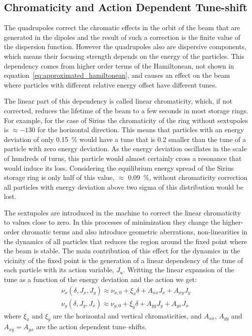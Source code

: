 \subsection{Chromaticity and Action Dependent Tune-shift}\label{sec:chromaticity}

	The quadrupoles correct the chromatic effects in the orbit of the beam that are generated in the dipoles and the result of such a correction is the finite value of the dispersion function. However the quadrupoles also are dispersive components, which means their focusing strength depends on the energy of the particles. This dependency comes from higher order terms of the Hamiltonean, not shown in equation~\eqref{eq:approximated_hamiltonean}, and causes an effect on the beam where particles with different relative energy offset have different tunes.

    The linear part of this dependency is called linear chromaticity, which, if not corrected, reduces the lifetime of the beam to a few seconds in most storage rings. For example, for the case of Sirius the chromaticity of the ring without sextupoles is $\approx -130$ for the horizontal direction. This means that particles with an energy deviation of only \SI{0.15}{\percent} would have a tune that is \SI{0.2}{} smaller than the tune of a particle with zero energy deviation. As the energy deviation oscillates in the scale of hundreds of turns, this particle would almost certainly cross a resonance that would induce its loss. Considering the equilibrium energy spread of the Sirius storage ring is only half of this value, $\approx$ \SI{0.09}{\percent}, without chromaticity correction all particles with energy deviation above two sigma of this distribution would be lost.

	The sextupoles are introduced in the machine to correct the linear chromaticity to values close to zero. In this processes of minimization they change the higher-order chromatic terms and also introduce geometric aberrations, non-linearities in the dynamics of all particles that reduces the region around the fixed point where the beam is stable. The main contribution of this effect for the dynamics in the vicinity of the fixed point is the generation of a linear dependency of the tune of each particle with its action variable, $J_u$. Writting the linear expansion of the tune as a function of the energy deviation and the action we get:
	\begin{align}
		\nu_x(\delta, J_x, J_y) \approx \nu_{x,0} + \xi_x \delta + A_{xx} J_x + A_{xy} J_y \\\nonumber
		\nu_y(\delta, J_y, J_x) \approx \nu_{y,0} + \xi_y \delta + A_{yy} J_y + A_{yx} J_x
	\end{align}
	where $\xi_x$ and $\xi_y$ are the horizontal and vertical chromaticities, and $A_{xx}$, $A_{yy}$ and $A_{xy}=A_{yx}$ are the action dependent tune--shifts.

